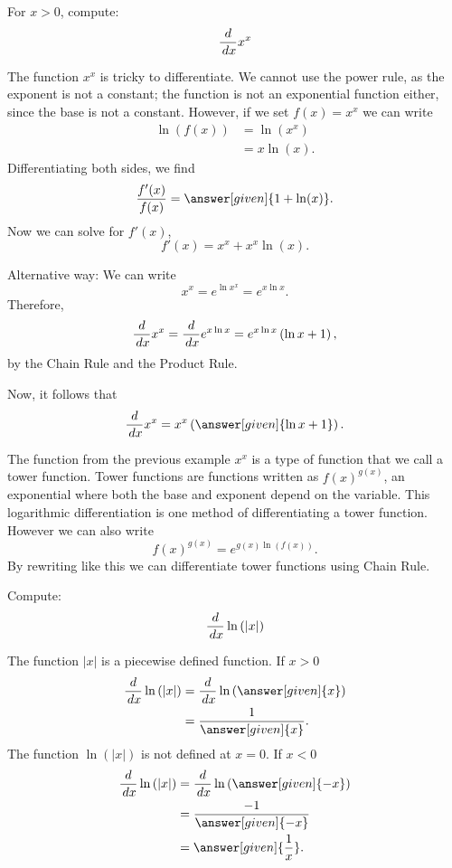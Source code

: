 \documentclass{ximera}
\begin{document}
\begin{example}
	For  $x>0$, compute: 
	\[ \frac{d}{\,d x} x^x \]
	\begin{explanation}
		The function $x^x$ is tricky to differentiate. We cannot use the power
		rule, as the exponent is not a constant; the function is not an exponential function either, since the base is not a constant. However, if we set $f(x) =
		x^x$ we can write
		\begin{align*}
			\ln(f(x)) &= \ln\left(x^x\right)\\
				&=x\ln(x).
		\end{align*}
		Differentiating both sides, we find
		\[ \frac{f'(x)}{f(x)} = \answer[given]{1 + \ln(x)}. \]
		Now we can solve for $f'(x)$, 
		\[ f'(x) = x^x + x^x\ln(x). \]
		
		Alternative way: We can write 
		\[ x^x= e^{\ln{x^x}}=e^{x\ln{x}}. \]
		Therefore,
		\[ \frac{d}{\,d x} x^x=\frac{d}{\,d x} e^{x\ln{x}}=e^{x\ln{x}}\left(\ln{x}+1\right), \]
		by the Chain Rule and the Product Rule.
		
		Now, it follows  that
		\[ \ddx x^x=x^x\left(\answer[given]{\ln{x}+1}\right). \]
	\end{explanation}
\end{example}

The function from the previous example $x^x$ is a type of function that we call a tower function. Tower functions are functions written as $f(x)^{g(x)}$, an exponential where both the base and exponent depend on the variable.
This logarithmic differentiation is one method of differentiating a tower function. However we can also write 
\[ f(x)^{g(x)} = e^{g(x)\ln( f(x) ) }. \]
By rewriting like this we can differentiate tower functions using Chain Rule.


\begin{example}
	Compute:
	\[ \frac{d}{\,d x}\ln{(|x|)} \]
	\begin{explanation}
		The function $|x|$ is a piecewise defined function.  If $x>0$
		\begin{align*}
			\ddx\ln{(|x|)} &= \ddx\ln{(\answer[given]{x})}\\
				&=\frac{1}{\answer[given]{x}}.
		\end{align*}
		The function $\ln{(|x|)}$ is not defined at $x=0$.  If $x<0$
		\begin{align*}
			\ddx\ln{(|x|)} &= \ddx\ln{(\answer[given]{-x})}\\
				&=\frac{-1}{\answer[given]{-x}}\\
				&=\answer[given]{\frac{1}{x}}.
		\end{align*}
	\end{explanation}
\end{example}
\end{document}
